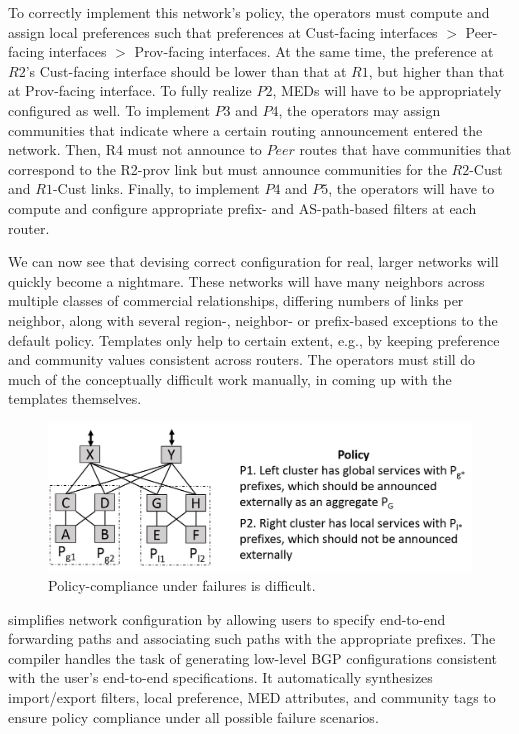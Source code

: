 To correctly implement this network's policy, the operators must compute and assign local preferences such that preferences at Cust-facing interfaces $>$ Peer-facing interfaces $>$ Prov-facing interfaces. At the same time, the preference at $R2$'s Cust-facing interface should be lower than that at $R1$, but higher than that at Prov-facing interface. To fully realize $P2$, MEDs will have to be appropriately configured as well. To implement $P3$ and $P4$, the operators may assign communities that indicate where a certain routing announcement entered the network. Then, R4 must not announce to $Peer$ routes that have communities that correspond to the R2-prov link but must announce communities for the $R2$-Cust and $R1$-Cust links. Finally, to implement $P4$ and $P5$, the operators will have to compute and configure appropriate prefix- and AS-path-based filters at each router.

We can now see that devising correct configuration for real, larger networks will quickly become a nightmare. These networks will have many neighbors across multiple classes of commercial relationships, differing numbers of links per neighbor, along with several region-, neighbor- or prefix-based exceptions to the default policy. Templates only help to certain extent, e.g., by keeping preference and community values consistent across routers. The operators must still do much of the conceptually difficult work manually, in coming up with the templates themselves. 

\begin{figure}[t!]
\centering
\includegraphics[width=\columnwidth]{figures/example2}
\caption{Policy-compliance under failures is difficult.}
\label{fig:example2}
\end{figure}

\sysname simplifies network configuration by allowing users to
specify end-to-end forwarding paths and associating such paths with
the appropriate prefixes.  The \sysname compiler handles the task of 
generating low-level BGP configurations consistent with the user's
end-to-end specifications.  It automatically synthesizes 
import/export filters, local preference, MED attributes, and community tags 
to ensure policy compliance under all possible failure scenarios.

